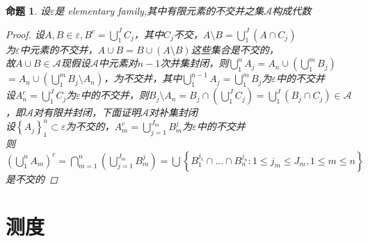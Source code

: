 \documentclass[12pt, a4paper, oneside]{ctexbook}
\newtheorem{proposition}[theorem]{命题}
\begin{document}
\begin{proposition}
    设$\varepsilon$是 elementary family,其中有限元素的不交并之集$\mathcal{A}$构成代数
    \begin{proof}
        设$A,B\in\varepsilon,B^c=\bigcup_1^JC_j$，其中$C_j$不交，$A\setminus B=\bigcup_1^J(A\cap C_j)$\\
        为$\varepsilon$中元素的不交并，$A\cup B=B\cup (A\setminus B)$这些集合是不交的，\\
        故$A\cup B\in\mathcal{A}$现假设$\mathcal{A}$中元素对$n-1$次并集封闭，则$\bigcup_1^n A_j=A_n\cup(\bigcup_1^mB_j)$\\
        $=A_n\cup(\bigcup_1^mB_j\setminus A_n)$，为不交并，其中$\bigcup_1^{n-1}A_j=\bigcup_1^mB_j$为$\varepsilon$中的不交并\\
        设$A_n^c=\bigcup_1^JC_j$为$\varepsilon$中的不交并，则$B_j\setminus A_n=B_j\cap(\bigcup_1^JC_j)=\bigcup_1^J(B_j\cap C_j)\in\mathcal{A}$
        ，即$\mathcal{A}$对有限并封闭，下面证明$\mathcal{A}$对补集封闭\\
        设$\left\{A_j\right\}_1^n\subset \varepsilon$为不交的，$A_m^c=\bigcup_{j=1}^{J_m}B_m^j$为$\varepsilon$中的不交并\\
        则$(\bigcup_1^nA_m)^c=\bigcap_{m=1}^n(\bigcup_{j=1}^{J_m}B_m^j)=\bigcup\left\{B_1^{j_1}\cap\dots\cap B_n^{j_n}:1\leq j_m\leq J_m,1\leq m\leq n\right\}$\\
        是不交的
    \end{proof}
\end{proposition}

\section{测度}
\end{document}
